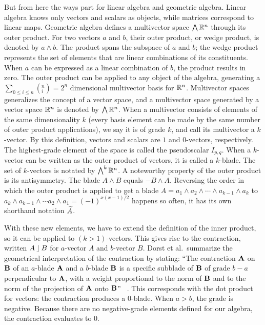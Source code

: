 But from here the ways part for linear algebra and geometric algebra.  Linear algebra knows only vectors and scalars as objects, while matrices correspond to linear maps.  Geometric algebra defines a multivector space $\bigwedge \mathbb{R}^n$ through its outer product.  For two vectors $a$ and $b$, their outer product, or wedge product, is denoted by $a \wedge b$.  The product spans the subspace of $a$ and $b$; the wedge product represents the set of elements that are linear combinations of its constituents.  When $a$ can be expressed as a linear combination of $b$, the product results in zero.  The outer product can be applied to any object of the algebra, generating a $\sum_{0 \leq i \leq n} \left(^n_i\right) = 2^n$ dimensional multivector basis for $\mathbb{R}^n$.  Multivector spaces generalizes the concept of a vector space, and a multivector space generated by a vector space $\mathbb{R}^n$ is denoted by $\bigwedge \mathbb{R}^n$.  When a multivector consists of elements of the same dimensionality $k$ (every basis element can be made by the same number of outer product applications), we say it is of grade $k$, and call its multivector a $k$-vector.  By this definition, vectors and scalars are $1$ and $0$-vectors, respectively.  The highest-grade element of the space is called the pseudoscalar $I_{p,q}$.  When a $k$-vector can be written as the outer product of vectors, it is called a $k$-blade.  The set of $k$-vectors is notated by $\bigwedge^k\mathbb{R}^n$.  A noteworthy property of the outer product is its antisymmetry.  The blade $A \wedge B$ equals $-B \wedge A$.  Reversing the order in which the outer product is applied to get a blade $A = a_1 \wedge a_2 \wedge \cdots \wedge a_{k-1} \wedge a_k$ to $a_k \wedge a_{k-1} \wedge \cdots a_2 \wedge a_1 = (-1)^{x(x-1)/2}$ happens so often, it has its own shorthand notation $\widetilde{A}$.

With these new elements, we have to extend the definition of the inner product, so it can be applied to $(k>1)$-vectors.  This gives rise to the contraction, written $A \mathbin{\rfloor} B$ for $a$-vector $A$ and $b$-vector $B$.  Dorst et al.\ summarize the geometrical interpretation of the contraction by stating: ``The contraction $\mathbf{A}$ on $\mathbf{B}$ of an $a$-blade $\mathbf{A}$ and a $b$-blade $\mathbf{B}$ is a specific subblade of $\mathbf{B}$ of grade $b-a$ perpendicular to $\mathbf{A}$, with a weight proportional to the norm of $\mathbf{B}$ and to the norm of the projection of $\mathbf{A}$ onto $\mathbf{B}$'' ~\cite[p.76]{TheBook}.  This corresponds with the dot product for vectors: the contraction produces a $0$-blade.  When $a > b$, the grade is negative.  Because there are no negative-grade elements defined for our algebra, the contraction evaluates to $0$.

